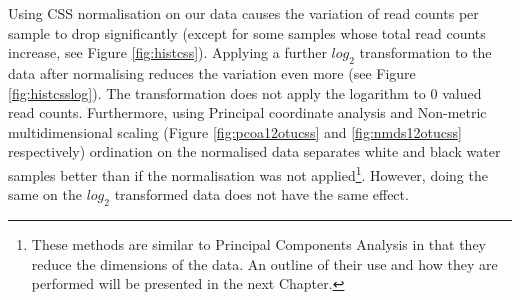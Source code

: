 Using CSS normalisation on our data causes the variation of read counts per sample to drop significantly (except for some samples whose total read counts increase, see Figure \ref{fig:histcss}). Applying a further $log_2$ transformation to the data after normalising reduces the variation even more (see Figure \ref{fig:histcsslog}). The transformation does not apply the logarithm to $0$ valued read counts.  Furthermore, using Principal coordinate analysis and Non-metric multidimensional scaling (Figure \ref{fig:pcoa12otucss} and \ref{fig:nmds12otucss} respectively) ordination on the normalised data separates white and black water samples better than if the normalisation was not applied\footnote{These methods are similar to Principal Components Analysis in that they reduce the dimensions of the data. An outline of their use and how they are performed will be presented in the next Chapter.}. However, doing the same on the $log_2$ transformed data does not have the same effect.

